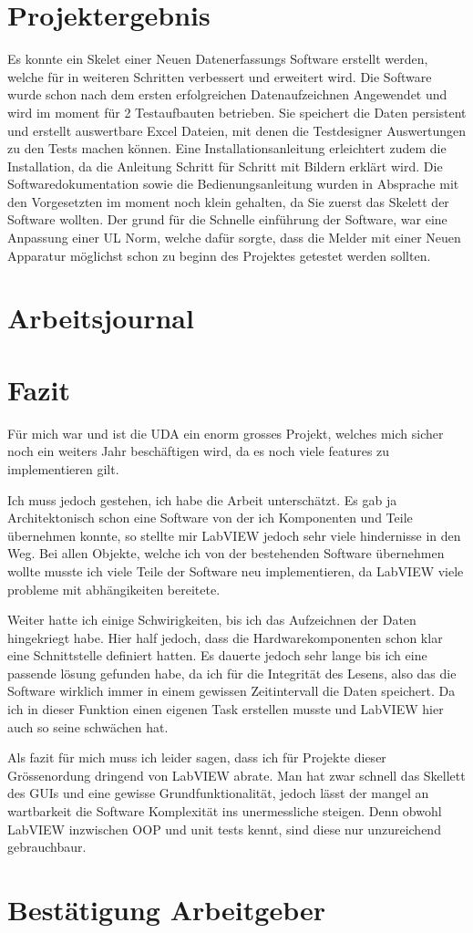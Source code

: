\documentclass[10pt]{scrartcl}
\begin{document}
\section{Projektergebnis}
Es konnte ein Skelet einer Neuen Datenerfassungs Software erstellt werden, welche für in weiteren Schritten verbessert und erweitert wird. Die Software wurde schon nach dem ersten erfolgreichen Datenaufzeichnen Angewendet und wird im moment für 2 Testaufbauten betrieben. Sie speichert die Daten persistent und erstellt auswertbare Excel Dateien, mit denen die Testdesigner Auswertungen zu den Tests machen können.
Eine Installationsanleitung erleichtert zudem die Installation, da die Anleitung Schritt für Schritt mit Bildern erklärt wird.
Die Softwaredokumentation sowie die Bedienungsanleitung wurden in Absprache mit den Vorgesetzten im moment noch klein gehalten, da Sie zuerst das Skelett der Software wollten. Der grund für die Schnelle einführung der Software, war eine Anpassung einer UL Norm, welche dafür sorgte, dass die Melder mit einer Neuen Apparatur möglichst schon zu beginn des Projektes getestet werden sollten.


\section{Arbeitsjournal}
\section{Fazit}
Für mich war und ist die UDA ein enorm grosses Projekt, welches mich sicher noch ein weiters Jahr beschäftigen wird, da es noch viele features zu implementieren gilt.

Ich muss jedoch gestehen, ich habe die Arbeit unterschätzt. Es gab ja Architektonisch schon eine Software von der ich Komponenten und Teile übernehmen konnte, so stellte mir LabVIEW jedoch sehr viele hindernisse in den Weg. Bei allen Objekte, welche ich von der bestehenden Software übernehmen wollte musste ich viele Teile der Software neu implementieren, da LabVIEW viele probleme mit abhängikeiten bereitete.

Weiter hatte ich einige Schwirigkeiten, bis ich das Aufzeichnen der Daten hingekriegt habe. Hier half jedoch, dass die Hardwarekomponenten schon klar eine Schnittstelle definiert hatten. Es dauerte jedoch sehr lange bis ich eine passende lösung gefunden habe, da ich für die Integrität des Lesens, also das die Software wirklich immer in einem gewissen Zeitintervall die Daten speichert. Da ich in dieser Funktion einen eigenen Task erstellen musste und LabVIEW hier auch so seine schwächen hat.

Als fazit für mich muss ich leider sagen, dass ich für Projekte dieser Grössenordung dringend von LabVIEW abrate. Man hat zwar schnell das Skellett des GUIs und eine gewisse Grundfunktionalität, jedoch lässt der mangel an wartbarkeit die Software Komplexität ins unermessliche steigen. Denn obwohl LabVIEW inzwischen OOP und unit tests kennt, sind diese nur unzureichend gebrauchbaur.
\section{Bestätigung Arbeitgeber}


\end{document}
